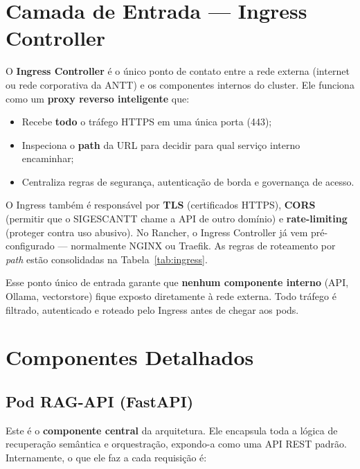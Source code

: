 \documentclass[12pt, a4paper]{article}
\begin{document}
\section{Camada de Entrada --- Ingress Controller}

O \textbf{Ingress Controller} é o único ponto de contato entre a rede externa (internet ou rede corporativa da ANTT) e os componentes internos do cluster. Ele funciona como um \textbf{proxy reverso inteligente} que:

\begin{itemize}
  \item Recebe \textbf{todo} o tráfego HTTPS em uma única porta (443);
  \item Inspeciona o \textbf{path} da URL para decidir para qual serviço interno encaminhar;
  \item Centraliza regras de segurança, autenticação de borda e governança de acesso.
\end{itemize}

O Ingress também é responsável por \textbf{TLS} (certificados HTTPS), \textbf{CORS} (permitir que o SIGESCANTT chame a API de outro domínio) e \textbf{rate-limiting} (proteger contra uso abusivo). No Rancher, o Ingress Controller já vem pré-configurado --- normalmente NGINX ou Traefik. As regras de roteamento por \textit{path} estão consolidadas na Tabela~\ref{tab:ingress}.

Esse ponto único de entrada garante que \textbf{nenhum componente interno} (API, Ollama, vectorstore) fique exposto diretamente à rede externa. Todo tráfego é filtrado, autenticado e roteado pelo Ingress antes de chegar aos pods.

\section{Componentes Detalhados}

\subsection{Pod RAG-API (FastAPI)}

Este é o \textbf{componente central} da arquitetura. Ele encapsula toda a lógica de recuperação semântica e orquestração, expondo-a como uma API REST padrão. Internamente, o que ele faz a cada requisição é:
\end{document}
